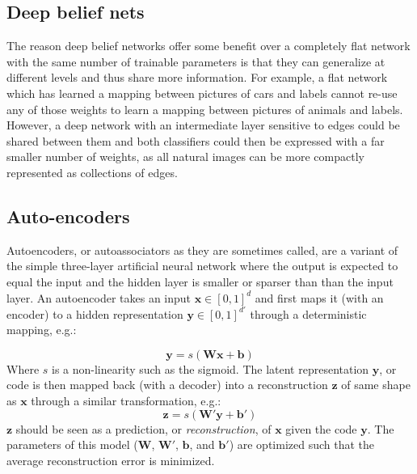 \documentclass[12pt]{article}
\begin{document}
	\subsection{Deep belief nets}
	
The reason deep belief networks offer some benefit over a completely flat network with the same number of trainable parameters is that they can generalize at different levels and thus share more information. For example, a flat network which has learned a mapping between pictures of cars and labels cannot re-use any of those weights to learn a mapping between pictures of animals and labels. However, a deep network with an intermediate layer sensitive to edges could be shared between them and both classifiers could then be expressed with a far smaller number of weights, as all natural images can be more compactly represented as collections of edges. 


	\subsection{Auto-encoders}
	
Autoencoders, or autoassociators as they are sometimes called, are a variant of the simple three-layer artificial neural network where the output is expected to equal the input and the hidden layer is smaller or sparser than than the input layer. %
An autoencoder takes an input $\mathbf x\in[0,1]^d$ and first maps it (with an encoder) %
to a hidden representation $\mathbf y\in[0,1]^{d'}$ through a deterministic mapping, e.g.:

\[
\mathbf y = s(\mathbf W\mathbf x + \mathbf b)
\]
Where $s$ is a non-linearity such as the sigmoid. %
The latent representation $\mathbf y$, or code is then mapped back (with a decoder) into a reconstruction $\mathbf z$ of same shape as $\mathbf x$  through a similar transformation, e.g.:
\[
\mathbf z = s(\mathbf W'\mathbf y + \mathbf b')
\]
$\mathbf z$ should be seen as a prediction, or {\it reconstruction}, of  $\mathbf x$ given the code  $\mathbf y$. The parameters of this model ($\mathbf W$, $\mathbf W'$, $\mathbf b$, and $\mathbf b'$) are optimized such that the average reconstruction error is minimized\cite{Bengio09}.
\end{document}
